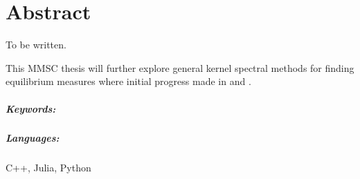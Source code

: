 \chapter*{Abstract}
\label{chap:abstract}
To be written.

This MMSC thesis will further explore general kernel spectral methods for finding equilibrium measures where initial progress made in \cite{2020-power-law-kernels} and \cite{2021-arbitrary-dimensions}.

\paragraph{Keywords:}
\thesiskeywords


\paragraph{Languages:}
C++, Julia, Python
